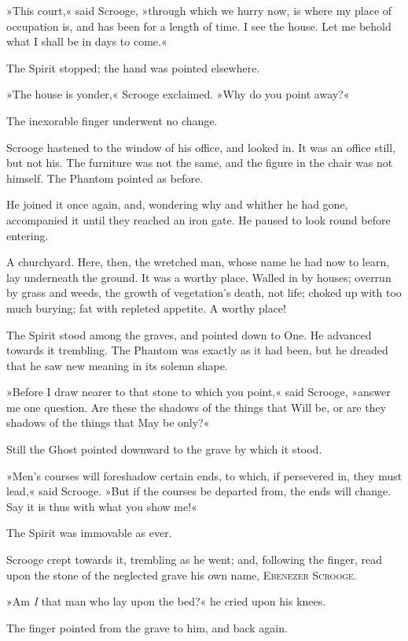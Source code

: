 »This court,« said Scrooge, »through which we hurry now, is where my place of occupation is, and has been for a length of time. I see the house. Let me behold what I shall be in days to come.«

The Spirit stopped; the hand was pointed elsewhere.

»The house is yonder,« Scrooge exclaimed. »Why do you point away?«

The inexorable finger underwent no change.

Scrooge hastened to the window of his office, and looked in. It was an office still, but not his. The furniture was not the same, and the figure in the chair was not himself. The Phantom pointed as before.

He joined it once again, and, wondering why and whither he had gone, accompanied it until they reached an iron gate. He paused to look round before entering.

A churchyard. Here, then, the wretched man, whose name he had now to learn, lay underneath the ground. It was a worthy place. Walled in by houses; overrun by grass and weeds, the growth of vegetation's death, not life; choked up with too much burying; fat with repleted appetite. A worthy place!

The Spirit stood among the graves, and pointed down to One. He advanced towards it trembling. The Phantom was exactly as it had been, but he dreaded that he saw new meaning in its solemn shape.

»Before I draw nearer to that stone to which you point,« said Scrooge, »answer me one question. Are these the shadows of the things that Will be, or are they shadows of the things that May be only?«

Still the Ghost pointed downward to the grave by which it stood.

»Men's courses will foreshadow certain ends, to which, if persevered in, they must lead,« said Scrooge. »But if the courses be departed from, the ends will change. Say it is thus with what you show me!«

The Spirit was immovable as ever.

Scrooge crept towards it, trembling as he went; and, following the finger, read upon the stone of the neglected grave his own name, \textsc{Ebenezer Scrooge}.

»Am \textit{I} that man who lay upon the bed?« he cried upon his knees.

The finger pointed from the grave to him, and back again.

